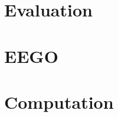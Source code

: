 \documentclass[preprint,12pt,authoryear]{elsarticle}
\theoremstyle{definition}
\begin{document}
\section{Evaluation}\label{evaluation}

\section{EEGO}\label{eego}

\section{Computation}\label{computation}











\end{document}
